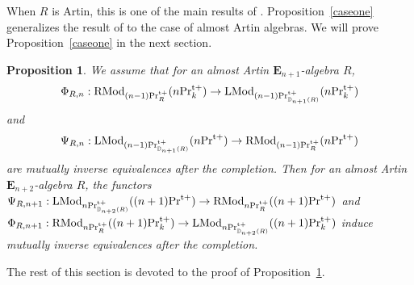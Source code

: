 \documentclass[leqno,12pt]{amsart}
\theoremstyle{plain}
\newtheorem{Proposition}[Theorem]{Proposition}
\theoremstyle{definition}
\newcommand{\DD}{\mathbb{D}}
\newcommand{\PRTT}{\textup{Pr}^{\textup{t}+}}
\newcommand{\LMod}{\operatorname{LMod}}
\newcommand{\RMod}{\operatorname{RMod}}
\begin{document}
When $R$ is Artin, this is one of the main results of \cite{IH}. Proposition~\ref{caseone} generalizes the result of \cite{IH} to the case of almost Artin algebras.
We will prove Proposition~\ref{caseone} in the next section.



\begin{Proposition}
\label{moritaleft}
We assume that
for an almost Artin $\mathbf{E}_{n+1}$-algebra $R$,
\[
\Phi_{R,n} :\RMod_{(n-1)\PRTT_R}(n\PRTT_k) \to  \LMod_{(n-1)\PRTT_{\DD_{n+1}(R)}}(n\PRTT_k)
\]
and 
\[
\Psi_{R,n}:\LMod_{(n-1)\PRTT_{\DD_{n+1}(R)}}(n\PRTT)  \to \RMod_{(n-1)\PRTT_{R}}(n\PRTT)
\]
are mutually inverse equivalences after the completion.
Then for an almost Artin $\mathbf{E}_{n+2}$-algebra $R$,
the functors $\Psi_{R,n+1}:\LMod_{n\PRTT_{\DD_{n+2}(R)}}((n+1)\PRTT)  \to \RMod_{n\PRTT_{R}}((n+1)\PRTT)$ and
$\Phi_{R,n+1}:\RMod_{n\PRTT_R}((n+1)\PRTT_k) \to  \LMod_{n\PRTT_{\DD_{n+2}(R)}}((n+1)\PRTT_k)$
induce mutually inverse equivalences after the completion.
\end{Proposition}

The rest of this section is  devoted to the proof of Proposition~\ref{moritaleft}.
\end{document}
